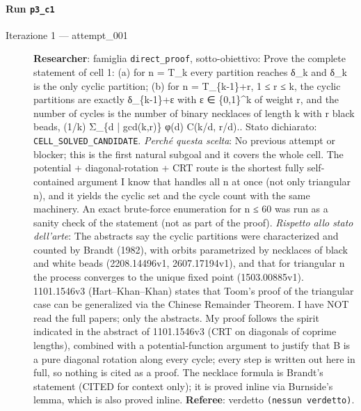 \documentclass[11pt,a4paper]{article}
\begin{document}
\paragraph{Run \texttt{p3\_c1}}
\begin{description}
\item[Iterazione 1 — attempt\_001]
\textbf{Researcher}: famiglia \texttt{direct\_proof}, sotto-obiettivo: Prove the complete statement of cell 1: (a) for n = T\_k every partition reaches δ\_k and δ\_k is the only cyclic partition; (b) for n = T\_\{k-1\}+r, 1 ≤ r ≤ k, the cyclic partitions are exactly δ\_\{k-1\}+ε with ε ∈ \{0,1\}\textasciicircum{}k of weight r, and the number of cycles is the number of binary necklaces of length k with r black beads, (1/k) Σ\_\{d | gcd(k,r)\} φ(d) C(k/d, r/d).. Stato dichiarato: \texttt{CELL\_SOLVED\_CANDIDATE}.
\emph{Perché questa scelta}: No previous attempt or blocker; this is the first natural subgoal and it covers the whole cell. The potential + diagonal-rotation + CRT route is the shortest fully self-contained argument I know that handles all n at once (not only triangular n), and it yields the cyclic set and the cycle count with the same machinery. An exact brute-force enumeration for n ≤ 60 was run as a sanity check of the statement (not as part of the proof).
\emph{Rispetto allo stato dell'arte}: The abstracts say the cyclic partitions were characterized and counted by Brandt (1982), with orbits parametrized by necklaces of black and white beads (2208.14496v1, 2607.17194v1), and that for triangular n the process converges to the unique fixed point (1503.00885v1). 1101.1546v3 (Hart–Khan–Khan) states that Toom's proof of the triangular case can be generalized via the Chinese Remainder Theorem. I have NOT read the full papers; only the abstracts. My proof follows the spirit indicated in the abstract of 1101.1546v3 (CRT on diagonals of coprime lengths), combined with a potential-function argument to justify that B is a pure diagonal rotation along every cycle; every step is written out here in full, so nothing is cited as a proof. The necklace formula is Brandt's statement (CITED for context only); it is proved inline via Burnside's lemma, which is also proved inline.
\textbf{Referee}: verdetto \texttt{(nessun verdetto)}.
\end{description}
\end{document}

